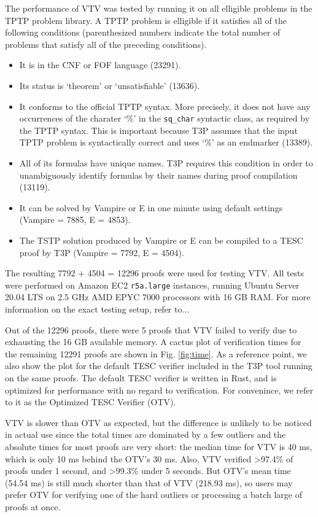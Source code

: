 \documentclass[12pt]{article}
\begin{document}
The performance of VTV was tested by running it on all elligible problems 
in the TPTP \cite{} problem library. A TPTP problem is elligible if it 
satisfies all of the following conditions (parenthesized numbers indicate 
the total number of problems that satisfy all of the preceding conditions).
\begin{itemize}
  \item It is in the CNF or FOF language (23291). 
  \item Its status is `theorem' or `unsatisfiable' (13636).
  \item It conforms to the official TPTP syntax. More precisely, 
    it does not have any occurrences of the charater `\%' in the 
    \verb|sq_char| syntactic class, as required by the TPTP syntax.
    This is important because T3P assumes that the input TPTP problem 
    is syntactically correct and uses `\%' as an endmarker (13389).
  \item All of its formulas have unique names. T3P requires this condition 
    in order to unambiguously identify formulas by their names during 
    proof compilation (13119).
  \item It can be solved by Vampire or E in one minute using 
    default settings (Vampire = 7885, E = 4853).
  \item The TSTP solution produced by Vampire or E can be compiled to 
    a TESC proof by T3P (Vampire = 7792, E = 4504).
\end{itemize}
The resulting 7792 + 4504 = 12296 proofs were used for testing VTV.
All tests were performed on Amazon EC2 \texttt{r5a.large} instances, 
running Ubuntu Server 20.04 LTS on 2.5 GHz AMD EPYC 7000 processors with 
16 GB RAM. For more information on the exact testing setup, refer to...

Out of the 12296 proofs, there were 5 proofs that VTV failed to verify 
due to exhausting the 16 GB available memory. A cactus plot of verification 
times for the remaining 12291 proofs are shown in Fig. \ref{fig:time}. 
As a reference point, we also show the plot for the default TESC verifier 
included in the T3P tool running on the same proofs. The default TESC verifier 
is written in Rust, and is optimized for performance with no regard to 
verification. For convenince, we refer to it as the Optimized TESC Verifier (OTV).



VTV is slower than OTV as expected, but the difference is unlikely
to be noticed in actual use since the total times are dominated by a few 
outliers and the absolute times for most proofs are very short: the median 
time for VTV is 40 ms, which is only 10 ms behind the OTV's 30 ms. Also,
VTV verified >97.4\% of proofs under 1 second, and >99.3\% under 5 seconds. 
But OTV's mean time (54.54 ms) is still much shorter than that of VTV (218.93 ms),
so users may prefer OTV for verifying one of the hard outliers or processing
a batch large of proofs at once.
\end{document}
